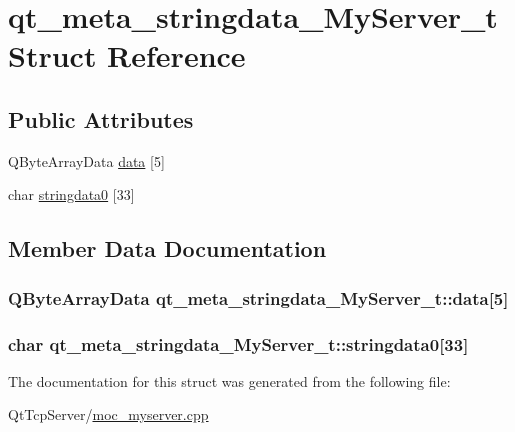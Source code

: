 \hypertarget{structqt__meta__stringdata___my_server__t}{}\section{qt\+\_\+meta\+\_\+stringdata\+\_\+\+My\+Server\+\_\+t Struct Reference}
\label{structqt__meta__stringdata___my_server__t}
\subsection*{Public Attributes}
\begin{DoxyCompactItemize}
\item 
Q\+Byte\+Array\+Data \hyperlink{structqt__meta__stringdata___my_server__t_ab15722048201cc80be7f2b05eece64e9}{data} \mbox{[}5\mbox{]}
\item 
char \hyperlink{structqt__meta__stringdata___my_server__t_a54652770c5771b1f6db92acb7932b3dd}{stringdata0} \mbox{[}33\mbox{]}
\end{DoxyCompactItemize}


\subsection{Member Data Documentation}
\subsubsection[{\texorpdfstring{data}{data}}]{\setlength{\rightskip}{0pt plus 5cm}Q\+Byte\+Array\+Data qt\+\_\+meta\+\_\+stringdata\+\_\+\+My\+Server\+\_\+t\+::data\mbox{[}5\mbox{]}}\hypertarget{structqt__meta__stringdata___my_server__t_ab15722048201cc80be7f2b05eece64e9}{}\label{structqt__meta__stringdata___my_server__t_ab15722048201cc80be7f2b05eece64e9}
\subsubsection[{\texorpdfstring{stringdata0}{stringdata0}}]{\setlength{\rightskip}{0pt plus 5cm}char qt\+\_\+meta\+\_\+stringdata\+\_\+\+My\+Server\+\_\+t\+::stringdata0\mbox{[}33\mbox{]}}\hypertarget{structqt__meta__stringdata___my_server__t_a54652770c5771b1f6db92acb7932b3dd}{}\label{structqt__meta__stringdata___my_server__t_a54652770c5771b1f6db92acb7932b3dd}


The documentation for this struct was generated from the following file\+:\begin{DoxyCompactItemize}
\item 
Qt\+Tcp\+Server/\hyperlink{moc__myserver_8cpp}{moc\+\_\+myserver.\+cpp}\end{DoxyCompactItemize}
